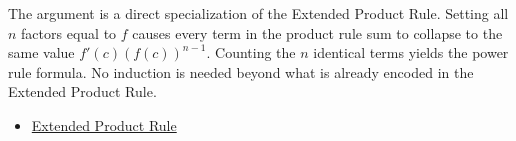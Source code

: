 \begin{remark*}
The argument is a direct specialization of the Extended Product Rule. Setting all $n$ factors equal to $f$ causes every term in the product rule sum to collapse to the same value $f'(c)(f(c))^{n-1}$. Counting the $n$ identical terms yields the power rule formula. No induction is needed beyond what is already encoded in the Extended Product Rule.
\end{remark*}

\begin{dependencies}
\begin{itemize}
  \item \hyperref[cor:extended-product-rule]{Extended Product Rule}
\end{itemize}
\end{dependencies}

\clearpage

